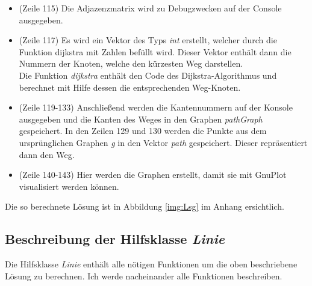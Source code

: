 \documentclass[a4paper]{scrartcl}
\begin{document}
\begin{itemize}
\begin{itemize}
	\end{itemize}
	\item (Zeile 115) Die Adjazenzmatrix wird zu Debugzwecken auf der Console ausgegeben.
	\item (Zeile 117) Es wird ein Vektor des Typs \textit{int} erstellt, welcher durch die Funktion dijkstra mit Zahlen befüllt wird. Dieser Vektor enthält dann die Nummern der Knoten, welche den kürzesten Weg darstellen.\\
	Die Funktion \textit{dijkstra} enthält den Code des Dijkstra-Algorithmus und berechnet mit Hilfe dessen die entsprechenden Weg-Knoten.
	\item (Zeile 119-133) Anschließend werden die Kantennummern auf der Konsole ausgegeben und die Kanten des Weges in den Graphen \textit{pathGraph} gespeichert. In den Zeilen 129 und 130 werden die Punkte aus dem ursprünglichen Graphen \textit{g} in den Vektor \textit{path} gespeichert. Dieser repräsentiert dann den Weg.
	\item (Zeile 140-143) Hier werden die Graphen erstellt, damit sie mit GnuPlot visualisiert werden können.
\end{itemize}

Die so berechnete Lösung ist in Abbildung \ref{img:Lsg} im Anhang ersichtlich.

\subsection*{Beschreibung der Hilfsklasse \textit{Linie}}
Die Hilfsklasse \textit{Linie} enthält alle nötigen Funktionen um die oben beschriebene Lösung zu berechnen. Ich werde nacheinander alle Funktionen beschreiben.
\end{document}
